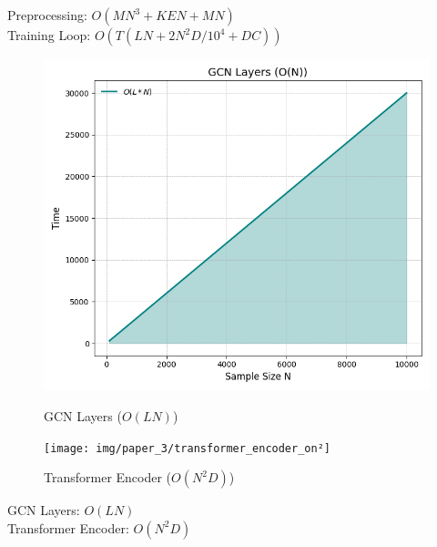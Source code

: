 \noindent Preprocessing: \(O(MN^3 + KEN + MN)\) \\
Training Loop: \(O(T(LN + 2N^2D/10^4 + DC))\)

\begin{figure}[H]
	\centering
	\begin{minipage}[b]{0.40\linewidth}
		\centering
		\includegraphics[width=\linewidth]{img/paper_3/gcn_layers_on}
		\caption{GCN Layers (\(O(LN)\))}
		\label{fig:gcnlayerson}
	\end{minipage}
	\hfill
	\begin{minipage}[b]{0.40\linewidth}
		\centering
		\texttt{[image: img/paper\_3/transformer\_encoder\_on²]}
		\caption{Transformer Encoder (\(O(N^2D)\))}
		\label{fig:transformerencoderon2}
	\end{minipage}
\end{figure}

\noindent GCN Layers: \(O(LN)\) \\
Transformer Encoder: \(O(N^2D)\)

